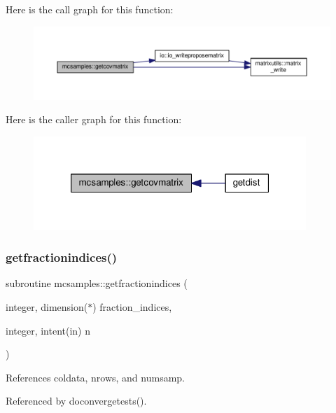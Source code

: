 Here is the call graph for this function\+:
\nopagebreak
\begin{figure}[H]
\begin{center}
\leavevmode
\includegraphics[width=350pt]{namespacemcsamples_a3b127162be572d0864c8bd49f3403a78_cgraph}
\end{center}
\end{figure}
Here is the caller graph for this function\+:
\nopagebreak
\begin{figure}[H]
\begin{center}
\leavevmode
\includegraphics[width=292pt]{namespacemcsamples_a3b127162be572d0864c8bd49f3403a78_icgraph}
\end{center}
\end{figure}
\mbox{\label{namespacemcsamples_a45291f5f8d4db1ad22598222a511e67c}} 
\subsubsection{\texorpdfstring{getfractionindices()}{getfractionindices()}}
{\footnotesize\ttfamily subroutine mcsamples\+::getfractionindices (\begin{DoxyParamCaption}\item[{integer, dimension($\ast$)}]{fraction\+\_\+indices,  }\item[{integer, intent(in)}]{n }\end{DoxyParamCaption})}



References coldata, nrows, and numsamp.



Referenced by doconvergetests().

